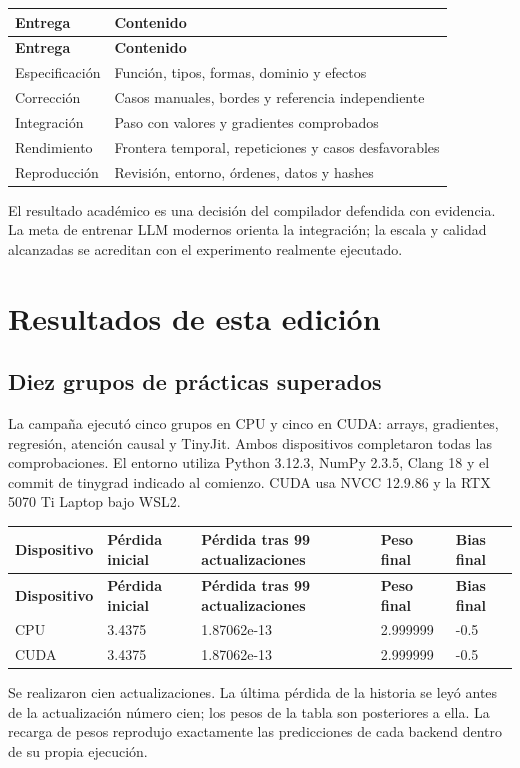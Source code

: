 \documentclass[12pt,a4paper,oneside]{report}
\begin{document}
{\small
\begin{longtable}{@{}P{0.3\textwidth}P{0.65\textwidth}@{}}
\toprule
\textbf{Entrega} & \textbf{Contenido}\\
\midrule
\endfirsthead
\toprule
\textbf{Entrega} & \textbf{Contenido}\\
\midrule
\endhead
Especificación & Función, tipos, formas, dominio y efectos\\
Corrección & Casos manuales, bordes y referencia independiente\\
Integración & Paso con valores y gradientes comprobados\\
Rendimiento & Frontera temporal, repeticiones y casos desfavorables\\
Reproducción & Revisión, entorno, órdenes, datos y hashes\\
\bottomrule
\end{longtable}
}
El resultado académico es una decisión del compilador defendida con evidencia. La meta de entrenar LLM modernos orienta la integración; la escala y calidad alcanzadas se acreditan con el experimento realmente ejecutado.

\chapter{Resultados de esta edición}
\section{Diez grupos de prácticas superados}
La campaña ejecutó cinco grupos en CPU y cinco en CUDA: arrays, gradientes, regresión, atención causal y TinyJit. Ambos dispositivos completaron todas las comprobaciones. El entorno utiliza Python 3.12.3, NumPy 2.3.5, Clang 18 y el commit de tinygrad indicado al comienzo. CUDA usa NVCC 12.9.86 y la RTX 5070 Ti Laptop bajo WSL2.

{\small
\begin{longtable}{@{}P{0.17\textwidth}P{0.18\textwidth}P{0.18\textwidth}P{0.18\textwidth}P{0.17\textwidth}@{}}
\toprule
\textbf{Dispositivo} & \textbf{Pérdida inicial} & \textbf{Pérdida tras 99 actualizaciones} & \textbf{Peso final} & \textbf{Bias final}\\
\midrule
\endfirsthead
\toprule
\textbf{Dispositivo} & \textbf{Pérdida inicial} & \textbf{Pérdida tras 99 actualizaciones} & \textbf{Peso final} & \textbf{Bias final}\\
\midrule
\endhead
CPU & 3.4375 & 1.87062e-13 & 2.999999 & -0.5\\
CUDA & 3.4375 & 1.87062e-13 & 2.999999 & -0.5\\
\bottomrule
\end{longtable}
}
Se realizaron cien actualizaciones. La última pérdida de la historia se leyó antes de la actualización número cien; los pesos de la tabla son posteriores a ella. La recarga de pesos reprodujo exactamente las predicciones de cada backend dentro de su propia ejecución.
\end{document}
